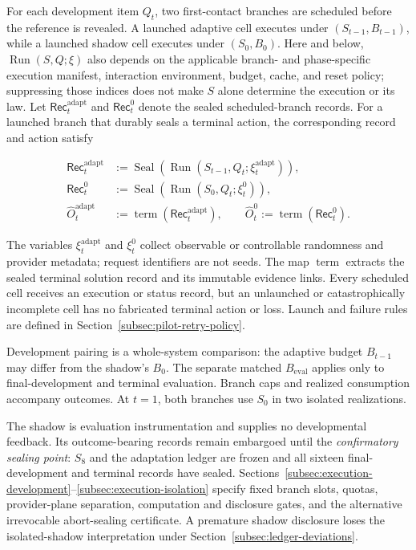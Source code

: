 \documentclass[10pt]{article} %
\providecommand{\1}{\mathbf{1}}  %
\theoremstyle{remark}
\theoremstyle{definition}
\begin{document}
For each development item $Q_t$, two first-contact branches are scheduled before the reference is revealed. A launched adaptive cell executes under $(S_{t-1},B_{t-1})$, while a launched shadow cell executes under $(S_0,B_0)$. Here and below, $\operatorname{Run}(S,Q;\xi)$ also depends on the applicable branch- and phase-specific execution manifest, interaction environment, budget, cache, and reset policy; suppressing those indices does not make $S$ alone determine the execution or its law. Let $\mathsf{Rec}_t^{\mathrm{adapt}}$ and $\mathsf{Rec}_t^0$ denote the sealed scheduled-branch records. For a launched branch that durably seals a terminal action, the corresponding record and action satisfy

\begin{align}
\mathsf{Rec}_t^{\mathrm{adapt}}
&:=
\operatorname{Seal}\!\left(
\operatorname{Run}(S_{t-1},Q_t;\xi_t^{\mathrm{adapt}})
\right),
\label{eq:pilot-adaptive-first-contact}\\
\mathsf{Rec}_t^{0}
&:=
\operatorname{Seal}\!\left(
\operatorname{Run}(S_0,Q_t;\xi_t^{0})
\right),
\label{eq:pilot-shadow-first-contact}\\
\widehat O_t^{\mathrm{adapt}}
&:=\operatorname{term}(\mathsf{Rec}_t^{\mathrm{adapt}}),
\qquad
\widehat O_t^0
:=\operatorname{term}(\mathsf{Rec}_t^0).
\label{eq:pilot-first-contact-actions}
\end{align}

The variables $\xi_t^{\mathrm{adapt}}$ and $\xi_t^0$ collect observable or
controllable randomness and provider metadata; request identifiers are not
seeds. The map $\operatorname{term}$ extracts the sealed terminal solution
record and its immutable evidence links. Every scheduled cell receives an
execution or status record, but an unlaunched or catastrophically incomplete
cell has no fabricated terminal action or loss. Launch and failure rules are
defined in Section~\ref{subsec:pilot-retry-policy}.

Development pairing is a whole-system comparison: the adaptive budget
$B_{t-1}$ may differ from the shadow's $B_0$. The separate matched
$B_{\mathrm{eval}}$ applies only to final-development and terminal evaluation.
Branch caps and realized consumption accompany outcomes. At $t=1$, both
branches use $S_0$ in two isolated realizations.

The shadow is evaluation instrumentation and supplies no developmental
feedback. Its outcome-bearing records remain embargoed until the
\emph{confirmatory sealing point}: $S_8$ and the adaptation ledger are frozen
and all sixteen final-development and terminal records have sealed.
Sections~\ref{subsec:execution-development}--\ref{subsec:execution-isolation}
specify fixed branch slots, quotas, provider-plane separation, computation
and disclosure gates, and the alternative irrevocable abort-sealing
certificate. A premature shadow disclosure loses the isolated-shadow
interpretation under Section~\ref{subsec:ledger-deviations}.
\end{document}
